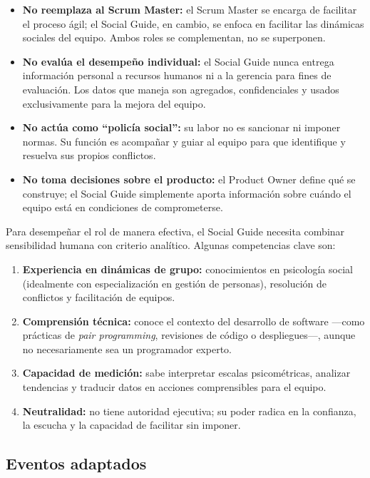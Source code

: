 \begin{itemize}
    \item \textbf{No reemplaza al Scrum Master:} el Scrum Master se encarga de facilitar el proceso ágil; el Social Guide, en cambio, se enfoca en facilitar las dinámicas sociales del equipo. Ambos roles se complementan, no se superponen.
    \item \textbf{No evalúa el desempeño individual:} el Social Guide nunca entrega información personal a recursos humanos ni a la gerencia para fines de evaluación. Los datos que maneja son agregados, confidenciales y usados exclusivamente para la mejora del equipo.
    \item \textbf{No actúa como ``policía social'':} su labor no es sancionar ni imponer normas. Su función es acompañar y guiar al equipo para que identifique y resuelva sus propios conflictos.
    \item \textbf{No toma decisiones sobre el producto:} el Product Owner define qué se construye; el Social Guide simplemente aporta información sobre cuándo el equipo está en condiciones de comprometerse.
\end{itemize}

Para desempeñar el rol de manera efectiva, el Social Guide necesita combinar sensibilidad humana con criterio analítico. Algunas competencias clave son:

\begin{enumerate}
    \item \textbf{Experiencia en dinámicas de grupo:} conocimientos en psicología social (idealmente con especialización en gestión de personas), resolución de conflictos y facilitación de equipos.
    \item \textbf{Comprensión técnica:} conoce el contexto del desarrollo de software —como prácticas de \textit{pair programming}, revisiones de código o despliegues—, aunque no necesariamente sea un programador experto.
    \item \textbf{Capacidad de medición:} sabe interpretar escalas psicométricas, analizar tendencias y traducir datos en acciones comprensibles para el equipo.
    \item \textbf{Neutralidad:} no tiene autoridad ejecutiva; su poder radica en la confianza, la escucha y la capacidad de facilitar sin imponer.
\end{enumerate}

\subsection{Eventos adaptados}


